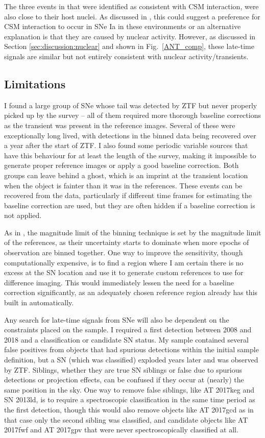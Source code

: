 \documentclass[a4paper,oneside,12pt, class=Latex/Classes/PhDthesisPSnPDF, crop=false]{standalone}
\begin{document}
The three events in \citet{Terwel_2024_paper1} that were identified as consistent with CSM interaction, were also close to their host nuclei. As discussed in \citet{Terwel_2024_paper1}, this could suggest a preference for CSM interaction to occur in SNe Ia in these environments or an alternative explanation is that they are caused by nuclear activity. However, as discussed in Section \ref{sec:discussion:nuclear} and shown in Fig.~\ref{ANT_comp}, these late-time signals are similar but not entirely consistent with nuclear activity/transients.


\subsection{Limitations}
\label{sec:discussion:limitations}
I found a large group of SNe whose tail was detected by ZTF but never properly picked up by the survey -- all of them required more thorough baseline corrections as the transient was present in the reference images. Several of these were exceptionally long lived, with detections in the binned data being recovered over a year after the start of ZTF. I also found some periodic variable sources that have this behaviour for at least the length of the survey, making it impossible to generate proper reference images or apply a good baseline correction. Both groups can leave behind a ghost, which is an imprint at the transient location when the object is fainter than it was in the references. These events can be recovered from the data, particularly if different time frames for estimating the baseline correction are used, but they are often hidden if a baseline correction is not applied. 

As in \citet{Terwel_2024_paper1}, the magnitude limit of the binning technique is set by the magnitude limit of the references, as their uncertainty starts to dominate when more epochs of observation are binned together. One way to improve the sensitivity, though computationally expensive, is to find a region where I am certain there is no excess at the SN location and use it to generate custom references to use for difference imaging. This would immediately lessen the need for a baseline correction significantly, as an adequately chosen reference region already has this built in automatically.

Any search for late-time signals from SNe will also be dependent on the constraints placed on the sample. I required a first detection between 2008 and 2018 and a classification or candidate SN status. My sample contained several false positives from objects that had spurious detections within the initial sample definition, but a SN (which was classified) exploded years later and was observed by ZTF. Siblings, whether they are true SN siblings or false due to spurious detections or projection effects, can be confused if they occur at (nearly) the same position in the sky. One way to remove false siblings, like AT 2017keg and SN 2013ld, is to require a spectroscopic classification in the same time period as the first detection, though this would also remove objects like AT 2017gcd as in that case only the second sibling was classified, and candidate objects like AT 2017fwf and AT 2017gpv that were never spectroscopically classified at all.
\end{document}
